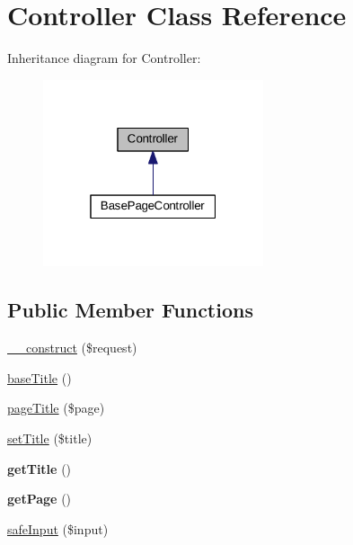 \hypertarget{classController}{\section{Controller Class Reference}
\label{classController}
}


Inheritance diagram for Controller\+:\nopagebreak
\begin{figure}[H]
\begin{center}
\leavevmode
\includegraphics[width=184pt]{classController__inherit__graph}
\end{center}
\end{figure}
\subsection*{Public Member Functions}
\begin{DoxyCompactItemize}
\item 
\hyperlink{classController_ab91faf91a99b21a429324499f9ec9f70}{\+\_\+\+\_\+construct} (\$request)
\item 
\hyperlink{classController_a3057228d46eddceb352a1537ef05e8b7}{base\+Title} ()
\item 
\hyperlink{classController_a555247a38f8b4ea98a85bed7c6798e0a}{page\+Title} (\$page)
\item 
\hyperlink{classController_ae560b1221cb9f3891c432c3dd0292922}{set\+Title} (\$title)
\item 
\hypertarget{classController_ae8b4904843b2d665164620160b3c7157}{{\bfseries get\+Title} ()}\label{classController_ae8b4904843b2d665164620160b3c7157}

\item 
\hypertarget{classController_aa844281accdd5aa2ca1ab1d890332b76}{{\bfseries get\+Page} ()}\label{classController_aa844281accdd5aa2ca1ab1d890332b76}

\item 
\hyperlink{classController_a90590c2cd8c1a89cc6eada64f0f24361}{safe\+Input} (\$input)
\end{DoxyCompactItemize}
